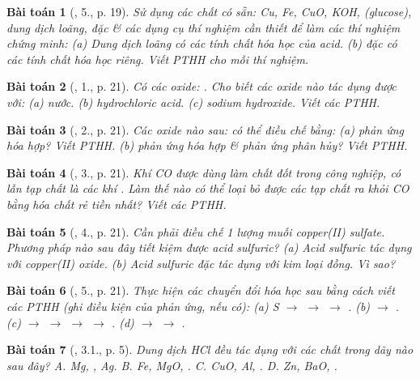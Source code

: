 \documentclass{article}
\newtheorem{baitoan}{Bài toán}
\begin{document}
\begin{baitoan}[\cite{SGK_Hoa_Hoc_9}, 5., p. 19]
	Sử dụng các chất có sẵn: \emph{Cu, Fe, CuO, KOH, } (glucose), dung dịch \emph{} loãng, \emph{} đặc \& các dụng cụ thí nghiệm cần thiết để làm các thí nghiệm chứng minh: (a) Dung dịch \emph{} loãng có các tính chất hóa học của acid. (b) \emph{} đặc có các tính chất hóa học riêng. Viết PTHH cho mỗi thí nghiệm.
\end{baitoan}

\begin{baitoan}[\cite{SGK_Hoa_Hoc_9}, 1., p. 21]
	Có các oxide: \emph{}. Cho biết các oxide nào tác dụng được với: (a) nước. (b) hydrochloric acid. (c) sodium hydroxide. Viết các PTHH.
\end{baitoan}

\begin{baitoan}[\cite{SGK_Hoa_Hoc_9}, 2., p. 21]
	Các oxide nào sau: \emph{} có thể điều chế bằng: (a) phản ứng hóa hợp? Viết PTHH. (b) phản ứng hóa hợp \& phản ứng phân hủy? Viết PTHH.
\end{baitoan}

\begin{baitoan}[\cite{SGK_Hoa_Hoc_9}, 3., p. 21]
	Khí \emph{CO} được dùng làm chất đốt trong công nghiệp, có lẫn tạp chất là các khí \emph{}. Làm thế nào có thể loại bỏ được các tạp chất ra khỏi \emph{CO} bằng hóa chất rẻ tiền nhất? Viết các PTHH.
\end{baitoan}

\begin{baitoan}[\cite{SGK_Hoa_Hoc_9}, 4., p. 21]
	Cần phải điều chế 1 lượng muối copper(II) sulfate. Phương pháp nào sau đây tiết kiệm được acid sulfuric? (a) Acid sulfuric tác dụng với copper(II) oxide. (b) Acid sulfuric đặc tác dụng với kim loại đồng. Vì sao?
\end{baitoan}

\begin{baitoan}[\cite{SGK_Hoa_Hoc_9}, 5., p. 21]
	Thực hiện các chuyển đổi hóa học sau bằng cách viết các PTHH (ghi điều kiện của phản ứng, nếu có): (a) \emph{S $\to$  $\to$  $\to$ }. (b) \emph{ $\to$ }. (c) \emph{ $\to$  $\to$  $\to$  $\to$ }. (d) \emph{ $\to$  $\to$ }.
\end{baitoan}

\begin{baitoan}[\cite{SBT_Hoa_Hoc_9}, 3.1., p. 5]
	Dung dịch \emph{HCl} đều tác dụng với các chất trong dãy nào sau đây? {\sf A.} \emph{Mg, , Ag}. {\sf B.} \emph{Fe, MgO, }. {\sf C.} \emph{CuO, Al, }. {\sf D.} \emph{Zn, BaO, }.
\end{baitoan}
\end{document}
